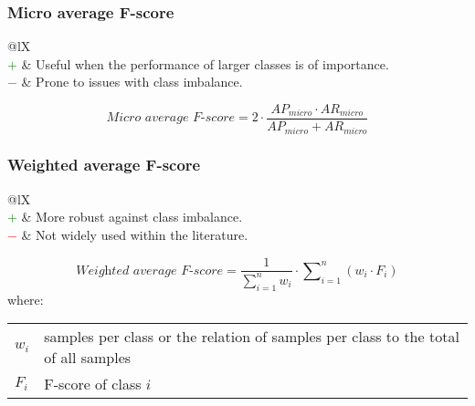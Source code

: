 \documentclass{article}
\makeatletter
\newenvironment{conditions}[1][where:]
	{\hspace{0.02\textwidth} #1 \begin{tabular}[t]{>{$}l<{$} @{${}={}$} l}}
	{\end{tabular}\\[\belowdisplayskip]}
\makeatother
\begin{document}
\subsubsection[Micro average F-score]{Micro average F-score \cite{goutte2005probabilistic, takahashi2022confidence}}

\begin{table}[H]\centering
	\begin{tabularx}{\textwidth}{@{}lX}
		 \\
		\textcolor{Green}{$+$} & Useful when the performance of larger classes is of importance. \\
		\textcolor{Red}{$-$}   & Prone to issues with class imbalance.
	\end{tabularx}
\end{table}

\begin{equation}
	\textit{Micro average F-score} = 2 \cdot \dfrac{\textit{AP}_\textit{micro} \cdot \textit{AR}_\textit{micro}}{\textit{AP}_\textit{micro} + \textit{AR}_\textit{micro}}
%
	\label{equation:MIAF}
\end{equation}


\subsubsection[Weighted average F-score]{Weighted average F-score \cite{al2016lili, alswaidan2020hybrid}}

\begin{table}[H]\centering
	\begin{tabularx}{\textwidth}{@{}lX}
		 \\
		\textcolor{Green}{$+$} & More robust against class imbalance. \\
		\textcolor{Red}{$-$}   & Not widely used within the literature.
	\end{tabularx}
\end{table}

\begin{equation}
	\textit{Weighted average F-score} = \dfrac{1}{\sum\nolimits_{i = 1}^n w_i} \cdot \sum\nolimits_{i = 1}^n (w_i \cdot F_i)
%
	\label{equation:WAF}
\end{equation}
%
\begin{conditions}
	w_i & samples per class or the relation of samples per class to the total of all samples \\
	F_i & F-score of class $i$
\end{conditions}
\end{document}
